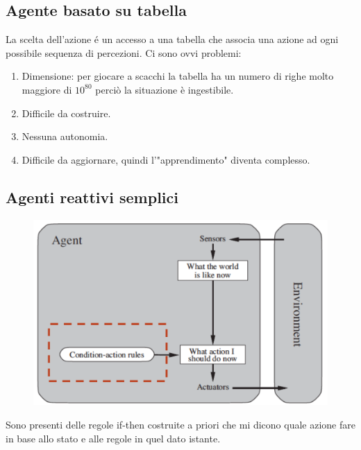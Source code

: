 \documentclass{article}
\begin{document}
\subsection{Agente basato su tabella}
La scelta dell'azione é un accesso a una tabella che associa una azione ad ogni possibile sequenza di percezioni. Ci sono ovvi problemi:
\begin{enumerate}
    \item Dimensione: per giocare a scacchi la tabella ha un numero di righe molto maggiore di $10^{80}$ perciò la situazione è ingestibile.
    \item Difficile da costruire.
    \item Nessuna autonomia.
    \item Difficile da aggiornare, quindi l'"apprendimento" diventa complesso.
\end{enumerate}

\subsection{Agenti reattivi semplici}
\begin{figure}[H]
    \centering
    \includegraphics[scale=0.4]{Images/agentireattivisemplici.png}
\end{figure}
Sono presenti delle regole if-then costruite a priori che mi dicono quale azione fare in base allo stato e alle regole in quel dato istante.
\clearpage
\end{document}

